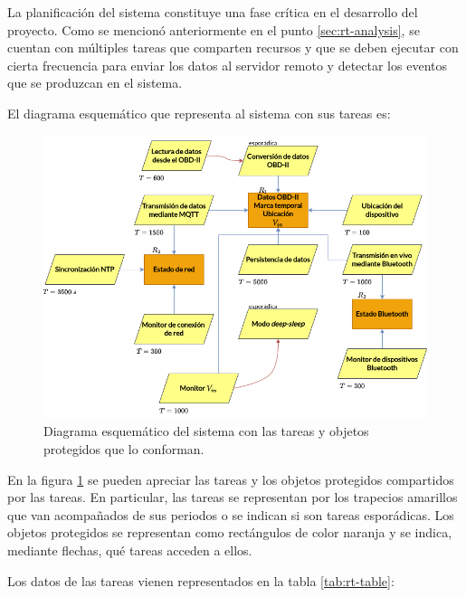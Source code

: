La planificación del sistema constituye una fase crítica en el desarrollo del
proyecto. Como se mencionó anteriormente en el punto \ref{sec:rt-analysis}, se
cuentan con múltiples tareas que comparten recursos y que se deben ejecutar
con cierta frecuencia para enviar los datos al servidor remoto y detectar los
eventos que se produzcan en el sistema.

El diagrama esquemático que representa al sistema con sus tareas es:

\begin{figure}[H]
  \centering
  \includegraphics[width=\linewidth]{images/Plannification.png}
  \caption{Diagrama esquemático del sistema con las tareas y objetos protegidos que lo conforman.}
  \label{fig:plannification-diagram}
\end{figure}

En la figura \ref{fig:plannification-diagram} se pueden apreciar las tareas y los
objetos protegidos compartidos por las tareas. En particular, las tareas se representan
por los trapecios amarillos que van acompañados de sus periodos o se indican si son
tareas esporádicas. Los objetos protegidos se representan como rectángulos de color
naranja y se indica, mediante flechas, qué tareas acceden a ellos.

Los datos de las tareas vienen representados en la tabla \ref{tab:rt-table}:

